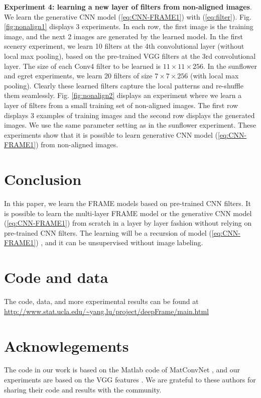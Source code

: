 \documentclass[letterpaper]{article}
\begin{document}
{\bf Experiment 4: learning a new layer of filters from non-aligned images}.  We learn the generative CNN model (\ref{eq:CNN-FRAME1}) with (\ref{eq:filter}). Fig. \ref{fig:nonalign1} displays 3 experiments. In each row, the first image is the training image, and the next 2 images are generated by the learned model. In the first scenery experiment, we learn 10 filters at the 4th convolutional layer (without local max pooling), based on the pre-trained VGG filters at the 3rd convolutional layer. The size of each Conv4 filter to be learned is $11 \times 11 \times 256$. In the sunflower and egret experiments, we learn 20 filters of size $7 \times 7 \times 256$ (with local max pooling).  Clearly these learned filters capture the local patterns and re-shuffle them seamlessly. Fig. \ref{fig:nonalign2} displays an experiment where we learn a layer of filters from a small training set of non-aligned images. The first row displays 3 examples of training images and the second row displays the generated images. We use the same parameter setting as in the sunflower experiment. These experiments show that it is possible to learn generative CNN model (\ref{eq:CNN-FRAME1}) from non-aligned images.

\section{Conclusion}

In this paper, we learn the FRAME models based on pre-trained CNN filters. It is possible to learn the multi-layer FRAME model or the generative CNN model (\ref{eq:CNN-FRAME1})  from scratch in a layer by layer fashion without relying on pre-trained CNN filters. The learning will be a recursion of model (\ref{eq:CNN-FRAME1}) , and it can be unsupervised without image labeling. 


\section*{Code and data}


The code, data, and more experimental results can be found at {\url{http://www.stat.ucla.edu/~yang.lu/project/deepFrame/main.html} }


\section*{Acknowlegements}

The code in our work is based on the Matlab code of MatConvNet \citep{matconvnn}, and our experiments are based on the VGG features \citep{simonyan2014very}. We are grateful to these authors for sharing their code and results with the community. 
\end{document}
